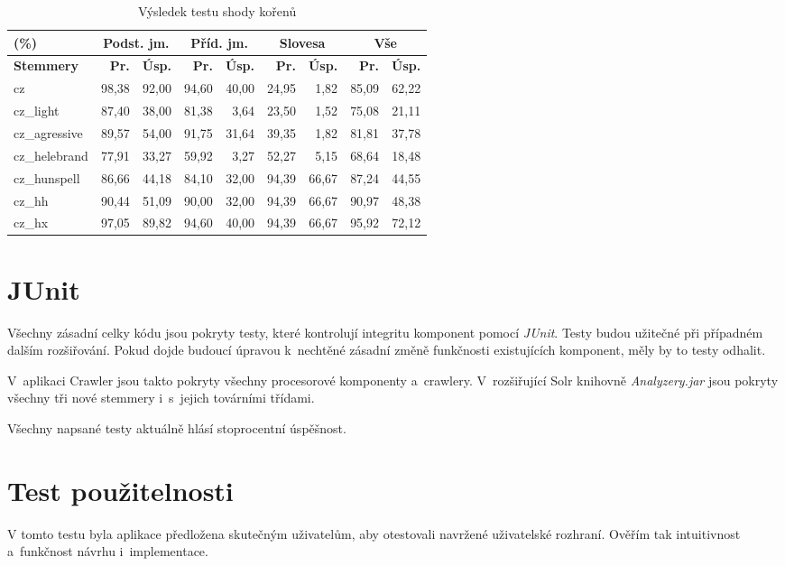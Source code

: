 \begin{table}
\begin{center}
\begin{tabular}{|l|r|r|r|r|r|r|r|r|}
\hline
(\%) & \multicolumn{2}{|c|}{\textbf{Podst. jm.}} & \multicolumn{2}{|c|}{\textbf{Příd. jm.}} & \multicolumn{2}{|c|}{\textbf{Slovesa}} & \multicolumn{2}{|c|}{\textbf{Vše}} \\ \hline
\textbf{Stemmery} & \textbf{Pr.} & \textbf{Úsp.} & \textbf{Pr.} & \textbf{Úsp.} & \textbf{Pr.} & \textbf{Úsp.} & \textbf{Pr.} & \textbf{Úsp.} \\ \hline
cz & 98,38 & 92,00 & 94,60 & 40,00 & 24,95 & 1,82 & 85,09 & 62,22 \\ \hline
cz\_light & 87,40 & 38,00 & 81,38 & 3,64 & 23,50 & 1,52 & 75,08 & 21,11 \\ \hline
cz\_agressive & 89,57 & 54,00 & 91,75 & 31,64 & 39,35 & 1,82 & 81,81 & 37,78 \\ \hline
cz\_helebrand & 77,91 & 33,27 & 59,92 & 3,27 & 52,27 & 5,15 & 68,64 & 18,48 \\ \hline
cz\_hunspell & 86,66 & 44,18 & 84,10 & 32,00 & 94,39 & 66,67 & 87,24 & 44,55 \\ \hline
\hline
cz\_hh & 90,44 & 51,09 & 90,00 & 32,00 & 94,39 & 66,67 & 90,97 & 48,38 \\ \hline
cz\_hx & 97,05 & 89,82 & 94,60 & 40,00 & 94,39 & 66,67 & 95,92 & 72,12 \\ \hline
\end{tabular}
\end{center}
\caption{Výsledek testu shody kořenů}
\label{tab:test_eql}
\end{table}

\section{JUnit}
Všechny zásadní celky kódu jsou pokryty testy, které kontrolují integritu komponent pomocí \emph{JUnit}. Testy budou užitečné při případném dalším rozšiřování. Pokud dojde budoucí úpravou k~nechtěné zásadní změně funkčnosti existujících komponent, měly by to testy odhalit.

V~aplikaci Crawler jsou takto pokryty všechny procesorové komponenty a~crawlery. V~rozšiřující Solr knihovně \emph{Analyzery.jar} jsou pokryty všechny tři nové stemmery i~s~jejich továrními třídami.

Všechny napsané testy aktuálně hlásí stoprocentní úspěšnost.

\section{Test použitelnosti}
V tomto testu byla aplikace předložena skutečným uživatelům, aby otestovali navržené uživatelské rozhraní. Ověřím tak intuitivnost a~funkčnost návrhu i~implementace.

